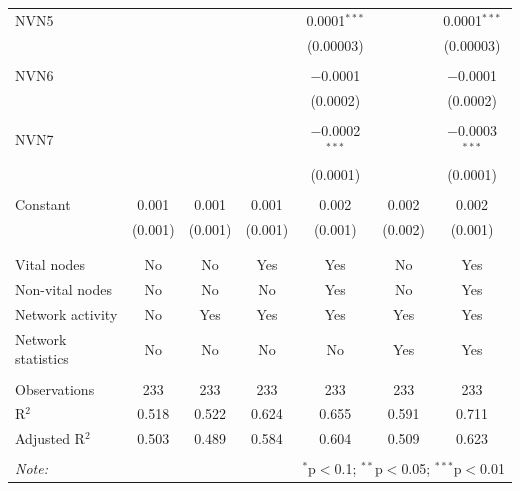 \begin{table}[!htbp]
\begin{tabular}{@{\extracolsep{5pt}}lcccccc}
 NVN5 &  &  &  & 0.0001$^{***}$ &  & 0.0001$^{***}$ \\ 
  &  &  &  & (0.00003) &  & (0.00003) \\ 
  & & & & & & \\ 
 NVN6 &  &  &  & $-$0.0001 &  & $-$0.0001 \\ 
  &  &  &  & (0.0002) &  & (0.0002) \\ 
  & & & & & & \\ 
 NVN7 &  &  &  & $-$0.0002$^{***}$ &  & $-$0.0003$^{***}$ \\ 
  &  &  &  & (0.0001) &  & (0.0001) \\ 
  & & & & & & \\ 
 Constant & 0.001 & 0.001 & 0.001 & 0.002 & 0.002 & 0.002 \\ 
  & (0.001) & (0.001) & (0.001) & (0.001) & (0.002) & (0.001) \\ 
  & & & & & & \\ 
\hline \\[-1.8ex] 
Vital nodes & No & No & Yes & Yes & No & Yes \\ 
Non-vital nodes & No & No & No & Yes & No & Yes \\ 
Network activity & No & Yes & Yes & Yes & Yes & Yes \\ 
Network statistics & No & No & No & No & Yes & Yes \\ 
\hline &  &  &  &  &  &  \\ 
Observations & 233 & 233 & 233 & 233 & 233 & 233 \\ 
R$^{2}$ & 0.518 & 0.522 & 0.624 & 0.655 & 0.591 & 0.711 \\ 
Adjusted R$^{2}$ & 0.503 & 0.489 & 0.584 & 0.604 & 0.509 & 0.623 \\ 
\hline 
\hline \\[-1.8ex] 
\textit{Note:}  & \multicolumn{6}{r}{$^{*}$p$<$0.1; $^{**}$p$<$0.05; $^{***}$p$<$0.01} \\ 
\end{tabular} 
\end{table} 
